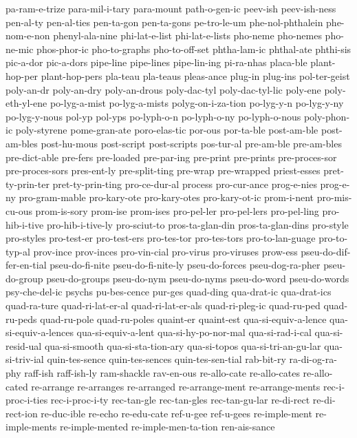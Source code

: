 {pa-ram-e-trize
para-mil-i-tary
para-mount
path-o-gen-ic
peev-ish
peev-ish-ness
pen-al-ty
pen-al-ties
pen-ta-gon
pen-ta-gons
pe-tro-le-um
phe-nol-phthalein
phe-nom-e-non
phenyl-ala-nine
phi-lat-e-list
phi-lat-e-lists
pho-neme
pho-nemes
pho-ne-mic
phos-phor-ic
pho-to-graphs
pho-to-off-set
phtha-lam-ic
phthal-ate
phthi-sis
pic-a-dor
pic-a-dors
pipe-line
pipe-lines
pipe-lin-ing
pi-ra-nhas
placa-ble
plant-hop-per
plant-hop-pers
pla-teau
pla-teaus
pleas-ance
plug-in
plug-ins
pol-ter-geist
poly-an-dr
poly-an-dry
poly-an-drous
poly-dac-tyl
poly-dac-tyl-lic
poly-ene
poly-eth-yl-ene
po-lyg-a-mist
po-lyg-a-mists
polyg-on-i-za-tion
po-lyg-y-n
po-lyg-y-ny
po-lyg-y-nous
pol-yp
pol-yps
po-lyph-o-n
po-lyph-o-ny
po-lyph-o-nous
poly-phon-ic
poly-styrene
pome-gran-ate
poro-elas-tic
por-ous
por-ta-ble
post-am-ble
post-am-bles
post-hu-mous
post-script
post-scripts
pos-tur-al
pre-am-ble
pre-am-bles
pre-dict-able
pre-fers
pre-loaded
pre-par-ing
pre-print
pre-prints
pre-proces-sor
pre-proces-sors
pres-ent-ly
pre-split-ting
pre-wrap
pre-wrapped
priest-esses
pret-ty-prin-ter
pret-ty-prin-ting
pro-ce-dur-al
process
pro-cur-ance
prog-e-nies
prog-e-ny
pro-gram-mable
pro-kary-ote
pro-kary-otes
pro-kary-ot-ic
prom-i-nent
pro-mis-cu-ous
prom-is-sory
prom-ise
prom-ises
pro-pel-ler
pro-pel-lers
pro-pel-ling
pro-hib-i-tive
pro-hib-i-tive-ly
pro-sciut-to
pros-ta-glan-din
pros-ta-glan-dins
pro-style
pro-styles
pro-test-er
pro-test-ers
pro-tes-tor
pro-tes-tors
pro-to-lan-guage
pro-to-typ-al
prov-ince
prov-inces
pro-vin-cial
pro-virus
pro-viruses
prow-ess
pseu-do-dif-fer-en-tial
pseu-do-fi-nite
pseu-do-fi-nite-ly
pseu-do-forces
pseu-dog-ra-pher
pseu-do-group
pseu-do-groups
pseu-do-nym
pseu-do-nyms
pseu-do-word
pseu-do-words
psy-che-del-ic
psychs
pu-bes-cence
pur-ges
quad-ding
qua-drat-ic
qua-drat-ics
quad-ra-ture
quad-ri-lat-er-al
quad-ri-lat-er-als
quad-ri-pleg-ic
quad-ru-ped
quad-ru-peds
quad-ru-pole
quad-ru-poles
quaint-er
quaint-est
qua-si-equiv-a-lence
qua-si-equiv-a-lences
qua-si-equiv-a-lent
qua-si-hy-po-nor-mal
qua-si-rad-i-cal
qua-si-resid-ual
qua-si-smooth
qua-si-sta-tion-ary
qua-si-topos
qua-si-tri-an-gu-lar
qua-si-triv-ial
quin-tes-sence
quin-tes-sences
quin-tes-sen-tial
rab-bit-ry
ra-di-og-ra-phy
raff-ish
raff-ish-ly
ram-shackle
rav-en-ous
re-allo-cate
re-allo-cates
re-allo-cated
re-arrange
re-arranges
re-arranged
re-arrange-ment
re-arrange-ments
rec-i-proc-i-ties
rec-i-proc-i-ty
rec-tan-gle
rec-tan-gles
rec-tan-gu-lar
re-di-rect
re-di-rect-ion
re-duc-ible
re-echo
re-edu-cate
ref-u-gee
ref-u-gees
re-imple-ment
re-imple-ments
re-imple-mented
re-imple-men-ta-tion
ren-ais-sance
}
